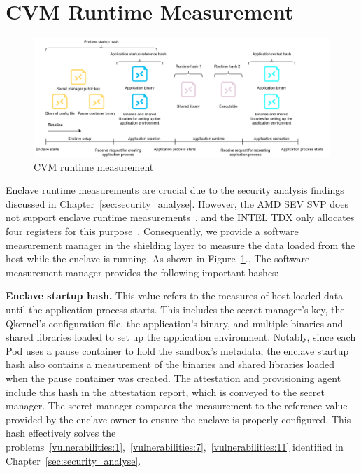\section{\acrshort{CVM} Runtime Measurement}
\label{sec:Enclave_Runtime_Measurement}
\begin{figure}[!htb]
    \centering
    \includegraphics[width=1\textwidth]{images/soft_ware_manager_meausrment.png}
    \caption[\acrshort{CVM} runtime measurement]{\acrshort{CVM} runtime measurement}
    \label{fig:soft_ware_manager_meausrment}
\end{figure}

Enclave runtime measurements are crucial due to the security analysis findings discussed in Chapter~\ref{sec:security_analyse}. However, the AMD SEV SVP does not support enclave runtime measurements~\cite*{snp_firmware}, and the INTEL TDX only allocates four registers for this purpose~\cite*{Intel_tdx_whitepaper}. Consequently, we provide a software measurement 
manager in the shielding layer to measure the data loaded from the host while the enclave is running. As shown in Figure~\ref{fig:soft_ware_manager_meausrment}., The software measurement manager provides the following important hashes:

\textbf{Enclave startup hash.} This value refers to the measures of host-loaded data until the application process starts. This includes the secret manager's key, the Qkernel's configuration file, the application's binary, and multiple binaries and shared libraries loaded to set up the application environment. Notably, since each Pod uses a pause container to hold the 
sandbox's metadata, the enclave startup hash also contains a measurement of the binaries and shared libraries loaded when the pause container was created. The attestation and provisioning agent include this hash in the attestation report, which is conveyed to the secret manager. The secret manager compares the measurement to the reference value provided 
by the enclave owner to ensure the enclave is properly configured. This hash effectively solves the problems~\ref{vulnerabilities:1},~\ref{vulnerabilities:7},~\ref{vulnerabilities:11} identified in Chapter~\ref{sec:security_analyse}.


